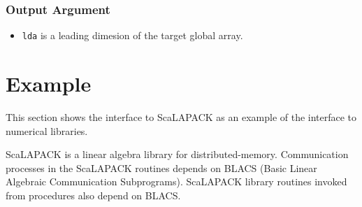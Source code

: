 \subsubsection*{Output Argument}
\begin{itemize}
 \item {\tt lda} is a leading dimesion of the target global array.
\end{itemize}


\section{Example}

   This section shows the interface to ScaLAPACK as an example of the
   {\XMP} interface to numerical libraries.
   
   ScaLAPACK is a linear algebra library for distributed-memory.
   Communication processes in the ScaLAPACK routines depends on BLACS
   (Basic Linear Algebraic Communication Subprograms).
   ScaLAPACK library routines invoked from {\XMP} procedures also depend
   on BLACS. %


